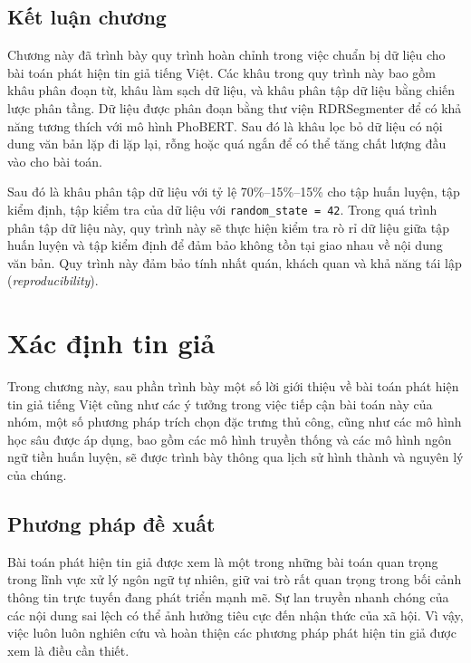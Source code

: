 \documentclass[12pt, a4paper]{report}
\begin{document}
\section{Kết luận chương}

Chương này đã trình bày quy trình hoàn chỉnh trong việc chuẩn bị dữ liệu cho bài toán 
phát hiện tin giả tiếng Việt. Các khâu trong quy trình này bao gồm khâu phân đoạn 
từ, khâu làm sạch dữ liệu, và khâu phân tập dữ liệu bằng chiến lược phân tầng. 
Dữ liệu được phân đoạn bằng thư viện RDRSegmenter để có khả năng tương thích với 
mô hình PhoBERT. Sau đó là khâu lọc bỏ dữ liệu có nội dung văn bản lặp đi lặp lại, 
rỗng hoặc quá ngắn để có thể tăng chất lượng đầu vào cho bài toán. 

Sau đó là khâu phân tập dữ liệu với tỷ lệ 70\%–15\%–15\% cho tập huấn luyện, tập 
kiểm định, tập kiểm tra của dữ liệu với \texttt{random\_state = 42}. Trong quá trình 
phân tập dữ liệu này, quy trình này sẽ thực hiện kiểm tra rò rỉ dữ liệu giữa tập huấn 
luyện và tập kiểm định để đảm bảo không tồn tại giao nhau về nội dung văn bản. 
Quy trình này đảm bảo tính nhất quán, khách quan và khả năng tái lập (\textit{reproducibility}).

\clearpage

\chapter{Xác định tin giả }

Trong chương này, sau phần trình bày một số lời giới thiệu về bài toán phát hiện tin giả tiếng Việt cũng như các ý tưởng trong việc tiếp cận bài toán này của nhóm, một số phương pháp trích chọn đặc trưng thủ công, cũng như các mô hình học sâu được áp dụng, bao gồm các mô hình truyền thống và các mô hình ngôn ngữ tiền huấn luyện, sẽ được trình bày thông qua lịch sử hình thành và nguyên lý của chúng.

\section{Phương pháp đề xuất}

Bài toán phát hiện tin giả được xem là một trong những bài toán quan trọng trong lĩnh vực xử lý ngôn ngữ tự nhiên, giữ vai trò rất quan trọng trong bối cảnh thông tin trực tuyến đang phát triển mạnh mẽ. Sự lan truyền nhanh chóng của các nội dung sai lệch có thể ảnh hưởng tiêu cực đến nhận thức của xã hội. Vì vậy, việc luôn luôn nghiên cứu và hoàn thiện các phương pháp phát hiện tin giả được xem là điều cần thiết. 
\end{document}
